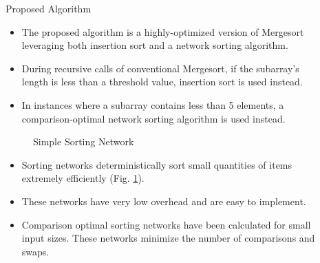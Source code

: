 \documentclass[final]{beamer}
\newlength{\sepwidth}
\newlength{\colwidth}
\newcommand{\squeezeup}{\vspace{-20.5mm}}
\newcommand{\separatorcolumn}{\begin{column}{\sepwidth}\end{column}}
\begin{document}
\begin{frame}[t]
\begin{columns}[t]
\begin{column}{\colwidth}
			\begin{block}{Proposed Algorithm}
				\begin{itemize}
					\item The proposed algorithm is a highly-optimized version of
					      Mergesort leveraging both insertion sort and a network sorting
					      algorithm.
					\item During recursive calls of conventional Mergesort, if the
					      subarray's length is less than a threshold value, insertion sort
					      is used instead.
					\item In instances where a subarray contains less than 5 elements, a
					      comparison-optimal network sorting algorithm is used instead.
				\end{itemize}
				\begin{figure}[h]
					\centering
					\squeezeup
					\squeezeup
					\caption{Simple Sorting Network}
					\label{fig:sortingnetwork}
				\end{figure}
				\vspace{-15.0mm}
				\begin{itemize}
					\item Sorting networks deterministically sort small quantities of
					      items extremely efficiently (Fig. \ref{fig:sortingnetwork}).
					\item These networks have very low overhead and are easy to implement.
					\item Comparison optimal sorting networks have been
					      calculated\parencite{knuth_networks} for small input sizes.
					      These networks minimize the number of comparisons and swaps.
				\end{itemize}
			\end{block}

		\end{column}

		\separatorcolumn

		\begin{column}{\colwidth}


\end{column}
\end{columns}
\end{frame}
\end{document}
